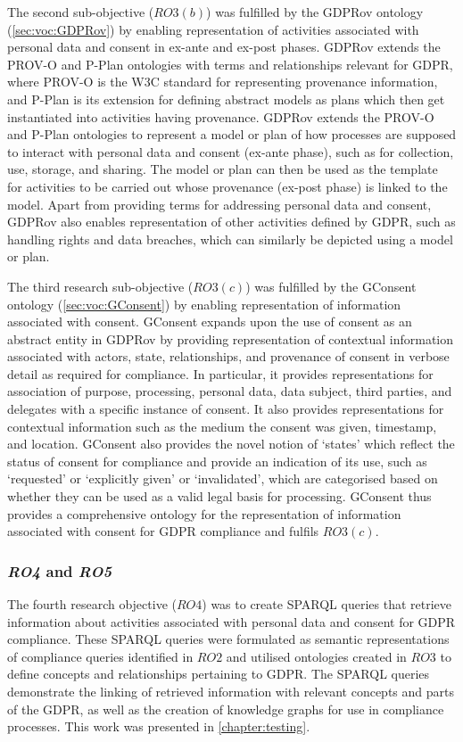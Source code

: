 The second sub-objective ($RO3(b)$) was fulfilled by the GDPRov ontology (\autoref{sec:voc:GDPRov}) by enabling representation of activities associated with personal data and consent in ex-ante and ex-post phases. GDPRov extends the PROV-O \cite{lebo_prov-o_2013} and P-Plan \cite{garijo_p-plan_2014} ontologies with terms and relationships relevant for GDPR, where PROV-O is the W3C standard for representing provenance information, and P-Plan is its extension for defining abstract models as plans which then get instantiated into activities having provenance. GDPRov extends the PROV-O and P-Plan ontologies to represent a model or plan of how processes are supposed to interact with personal data and consent (ex-ante phase), such as for collection, use, storage, and sharing. The model or plan can then be used as the template for activities to be carried out whose provenance (ex-post phase) is linked to the model. Apart from providing terms for addressing personal data and consent, GDPRov also enables representation of other activities defined by GDPR, such as handling rights and data breaches, which can similarly be depicted using a model or plan.

The third research sub-objective ($RO3(c)$) was fulfilled by the GConsent ontology (\autoref{sec:voc:GConsent}) by enabling representation of information associated with consent. GConsent expands upon the use of consent as an abstract entity in GDPRov by providing representation of contextual information associated with actors, state, relationships, and provenance of consent in verbose detail as required for compliance. In particular, it provides representations for association of purpose, processing, personal data, data subject, third parties, and delegates with a specific instance of consent. It also provides representations for contextual information such as the medium the consent was given, timestamp,  and location. GConsent also provides the novel notion of `states' which reflect the status of consent for compliance and provide an indication of its use, such as `requested' or `explicitly given' or `invalidated', which are categorised based on whether they can be used as a valid legal basis for processing. GConsent thus provides a comprehensive ontology for the representation of information associated with consent for GDPR compliance and fulfils $RO3(c)$.

\subsubsection*{\textit{RO4} and \textit{RO5}}
The fourth research objective ($RO4$) was to create SPARQL queries that retrieve information about activities associated with personal data and consent for GDPR compliance. These SPARQL queries were formulated as semantic representations of compliance queries identified in $RO2$ and utilised ontologies created in $RO3$ to define concepts and relationships pertaining to GDPR. The SPARQL queries demonstrate the linking of retrieved information with relevant concepts and parts of the GDPR, as well as the creation of knowledge graphs for use in compliance processes. This work was presented in \autoref{chapter:testing}.

